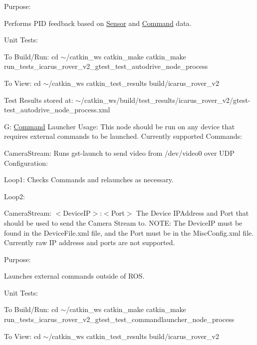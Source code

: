 Purpose\+:
\begin{DoxyEnumerate}
\item Performs P\+ID feedback based on \hyperlink{structSensor}{Sensor} and \hyperlink{structCommand}{Command} data.
\end{DoxyEnumerate}

Unit Tests\+:
\begin{DoxyEnumerate}
\item To Build/\+Run\+: cd $\sim$/catkin\+\_\+ws catkin\+\_\+make catkin\+\_\+make run\+\_\+tests\+\_\+icarus\+\_\+rover\+\_\+v2\+\_\+gtest\+\_\+test\+\_\+autodrive\+\_\+node\+\_\+process
\item To View\+: cd $\sim$/catkin\+\_\+ws catkin\+\_\+test\+\_\+results build/icarus\+\_\+rover\+\_\+v2
\end{DoxyEnumerate}

Test Results stored at\+: $\sim$/catkin\+\_\+ws/build/test\+\_\+results/icarus\+\_\+rover\+\_\+v2/gtest-\/test\+\_\+autodrive\+\_\+node\+\_\+process.xml

G\+: \hyperlink{structCommand}{Command} Launcher Usage\+: This node should be run on any device that requires external commands to be launched. Currently supported Commands\+:
\begin{DoxyItemize}
\item Camera\+Stream\+: Runs gst-\/launch to send video from /dev/video0 over U\+DP Configuration\+:
\item Loop1\+: Checks Commands and relaunches as necessary.
\item Loop2\+:
\item Camera\+Stream\+: $<$\+Device\+I\+P$>$\+:$<$\+Port$>$ The Device I\+P\+Address and Port that should be used to send the Camera Stream to. N\+O\+TE\+: The Device\+IP must be found in the Device\+File.\+xml file, and the Port must be in the Misc\+Config.\+xml file. Currently raw IP address\textquotesingle{}s and ports are not supported.
\end{DoxyItemize}

Purpose\+:
\begin{DoxyEnumerate}
\item Launches external commands outside of R\+OS.
\end{DoxyEnumerate}

Unit Tests\+:
\begin{DoxyEnumerate}
\item To Build/\+Run\+: cd $\sim$/catkin\+\_\+ws catkin\+\_\+make catkin\+\_\+make run\+\_\+tests\+\_\+icarus\+\_\+rover\+\_\+v2\+\_\+gtest\+\_\+test\+\_\+commandlauncher\+\_\+node\+\_\+process
\item To View\+: cd $\sim$/catkin\+\_\+ws catkin\+\_\+test\+\_\+results build/icarus\+\_\+rover\+\_\+v2
\end{DoxyEnumerate}

